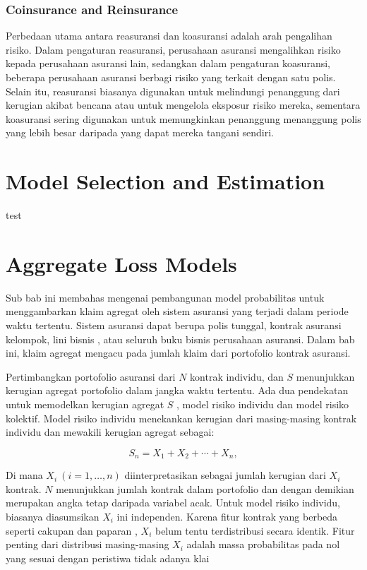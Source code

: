 \documentclass[
]{book}
\begin{document}
\hypertarget{coinsurance-and-reinsurance}{%
\subsection{Coinsurance and Reinsurance}\label{coinsurance-and-reinsurance}}

Perbedaan utama antara reasuransi dan koasuransi adalah arah pengalihan risiko. Dalam pengaturan reasuransi, perusahaan asuransi mengalihkan risiko kepada perusahaan asuransi lain, sedangkan dalam pengaturan koasuransi, beberapa perusahaan asuransi berbagi risiko yang terkait dengan satu polis. Selain itu, reasuransi biasanya digunakan untuk melindungi penanggung dari kerugian akibat bencana atau untuk mengelola eksposur risiko mereka, sementara koasuransi sering digunakan untuk memungkinkan penanggung menanggung polis yang lebih besar daripada yang dapat mereka tangani sendiri.

\hypertarget{model-selection-and-estimation}{%
\chapter{Model Selection and Estimation}\label{model-selection-and-estimation}}

test

\hypertarget{aggregate-loss-models}{%
\chapter{Aggregate Loss Models}\label{aggregate-loss-models}}

Sub bab ini membahas mengenai pembangunan model probabilitas untuk menggambarkan klaim agregat oleh sistem asuransi yang terjadi dalam periode waktu tertentu. Sistem asuransi dapat berupa polis tunggal, kontrak asuransi kelompok, lini bisnis , atau seluruh buku bisnis perusahaan asuransi. Dalam bab ini, klaim agregat mengacu pada jumlah klaim dari portofolio kontrak asuransi.

Pertimbangkan portofolio asuransi dari \(N\) kontrak individu, dan \(S\) menunjukkan kerugian agregat portofolio dalam jangka waktu tertentu. Ada dua pendekatan untuk memodelkan kerugian agregat \(S\) , model risiko individu dan model risiko kolektif. Model risiko individu menekankan kerugian dari masing-masing kontrak individu dan mewakili kerugian agregat sebagai:

\[S_n=X_1 +X_2 +\cdots+X_n,\]

Di mana \(X_i~(i=1,\ldots,n)\) diinterpretasikan sebagai jumlah kerugian dari \(X_i\) kontrak. \(N\) menunjukkan jumlah kontrak dalam portofolio dan dengan demikian merupakan angka tetap daripada variabel acak. Untuk model risiko individu, biasanya diasumsikan \(X_i\) ini independen. Karena fitur kontrak yang berbeda seperti cakupan dan paparan , \(X_i\) belum tentu terdistribusi secara identik. Fitur penting dari distribusi masing-masing \(X_i\) adalah massa probabilitas pada nol yang sesuai dengan peristiwa tidak adanya klai
\end{document}
